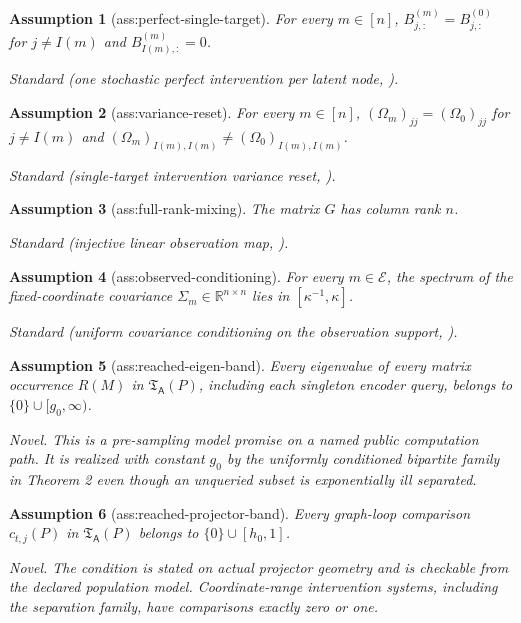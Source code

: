 \documentclass{article}
\newtheorem{assumption}{Assumption}
\begin{document}
\begin{assumption}[ass:perfect-single-target]\label{ass:perfect-single-target}
For every \(m\in[n]\), \(B^{(m)}_{j,:}=B^{(0)}_{j,:}\) for \(j\ne I(m)\) and \(B^{(m)}_{I(m),:}=0\).
\par\smallskip\noindent\emph{Standard} (one stochastic perfect intervention per latent node, \cite{squires2023linear}).
\end{assumption}

\begin{assumption}[ass:variance-reset]\label{ass:variance-reset}
For every \(m\in[n]\), \((\Omega_m)_{jj}=(\Omega_0)_{jj}\) for \(j\ne I(m)\) and \((\Omega_m)_{I(m),I(m)}\ne(\Omega_0)_{I(m),I(m)}\).
\par\smallskip\noindent\emph{Standard} (single-target intervention variance reset, \cite{squires2023linear}).
\end{assumption}

\begin{assumption}[ass:full-rank-mixing]\label{ass:full-rank-mixing}
The matrix \(G\) has column rank \(n\).
\par\smallskip\noindent\emph{Standard} (injective linear observation map, \cite{acarturk2024sample}).
\end{assumption}

\begin{assumption}[ass:observed-conditioning]\label{ass:observed-conditioning}
For every \(m\in\mathcal E\), the spectrum of the fixed-coordinate covariance \(\Sigma_m\in\mathbb R^{n\times n}\) lies in \([\kappa^{-1},\kappa]\).
\par\smallskip\noindent\emph{Standard} (uniform covariance conditioning on the observation support, \cite{lee2026beyond}).
\end{assumption}

\begin{assumption}[ass:reached-eigen-band]\label{ass:reached-eigen-band}
Every eigenvalue of every matrix occurrence \(R(M)\) in \(\mathfrak T_{\mathsf A}(P)\), including each singleton encoder query, belongs to \(\{0\}\cup[g_0,\infty)\).
\par\smallskip\noindent\emph{Novel.} This is a pre-sampling model promise on a named public computation path. It is realized with constant \(g_0\) by the uniformly conditioned bipartite family in Theorem 2 even though an unqueried subset is exponentially ill separated.
\end{assumption}

\begin{assumption}[ass:reached-projector-band]\label{ass:reached-projector-band}
Every graph-loop comparison \(c_{t,j}(P)\) in \(\mathfrak T_{\mathsf A}(P)\) belongs to \(\{0\}\cup[h_0,1]\).
\par\smallskip\noindent\emph{Novel.} The condition is stated on actual projector geometry and is checkable from the declared population model. Coordinate-range intervention systems, including the separation family, have comparisons exactly zero or one.
\end{assumption}
\end{document}
